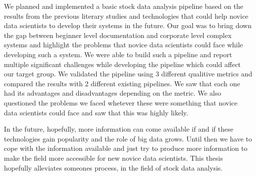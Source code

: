 We planned and implemented a basic stock data analysis pipeline based on the results from the previous literary studies and technologies that could help novice data scientists to develop their systems in the future.
Our goal was to bring down the gap between beginner level documentation and corporate level complex systems and highlight the problems that novice data scientists could face while developing such a system.
We were able to build such a pipeline and report multiple significant challenges while developing the pipeline which could affect our target group.
We validated the pipeline using 3 different qualitive metrics and compared the results with 2 different existing pipelines.
We saw that each one had its advantages and disadvantages depending on the metric.
We also questioned the problems we faced whetever these were something that novice data scientists could face and saw that this was highly likely.

In the future, hopefully, more information can come available if and if these technologies gain popularity and the role of big data grows.
Until then we have to cope with the information available and just try to produce more information to make the field more accessible for new novice data scientists.
This thesis hopefully alleviates someones process, in the field of stock data analysis.
